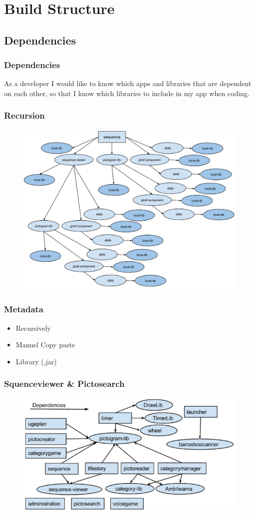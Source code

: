 \section{Build Structure}
\subsection{Dependencies}
\begin{frame}
	\frametitle{Dependencies}
	As a developer I would like to know which apps and libraries that are dependent on each other, so that I know which libraries to include in my app when coding.
\end{frame}
\begin{frame}
	\frametitle{Recursion}
	\begin{figure}[H]
			\centering
			\includegraphics[width= 0.8 \textwidth]{pictures/oldbuild.png}
	\end{figure}
\end{frame}
\begin{frame}
	\frametitle{Metadata}
		\begin{itemize}
			\item Recursively
			\item Manuel Copy paste
			\item Library (.jar)			
		\end{itemize}
\end{frame}
\begin{frame}
	\frametitle{Squenceviewer \& Pictosearch}
	\begin{figure}[H]
				\centering
				\includegraphics[width= 0.8 \textwidth]{pictures/AppLibependencies.png}
	\end{figure}
\end{frame}
